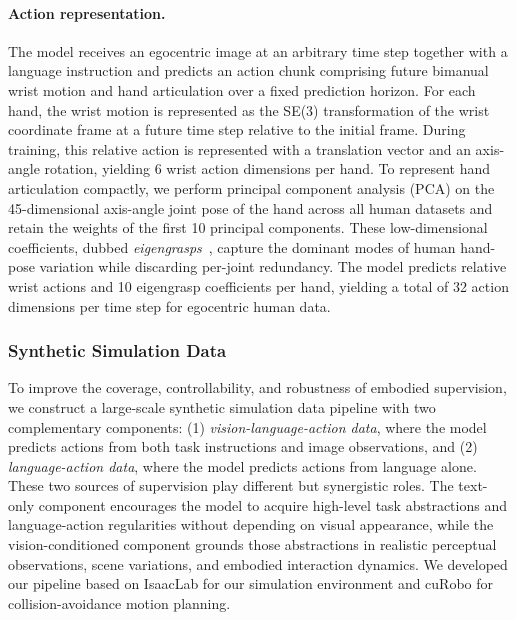 \documentclass{llmxive}
\begin{document}
\paragraph{Action representation.}
The model receives an egocentric image at an arbitrary time step together with a language instruction and predicts an action chunk comprising future bimanual wrist motion and hand articulation over a fixed prediction horizon. 
For each hand, the wrist motion is represented as the SE(3) transformation of the wrist coordinate frame at a future time step relative to the initial frame. During training, this relative action is represented with a translation vector and an axis-angle rotation, yielding 6 wrist action dimensions per hand.
To represent hand articulation compactly, we perform principal component analysis (PCA) on the 45-dimensional axis-angle joint pose of the hand across all human datasets and retain the weights of the first 10 principal components. These low-dimensional coefficients, dubbed \emph{eigengrasps}~\citep{ciocarlie2007dexterous, yuan2024crossdex}, capture the dominant modes of human hand-pose variation while discarding per-joint redundancy. The model predicts relative wrist actions and 10 eigengrasp coefficients per hand, yielding a total of 32 action dimensions per time step for egocentric human data.


\subsubsection{Synthetic Simulation Data}
\label{subsubsection:SyntheticSimulationData}
To improve the coverage, controllability, and robustness of embodied supervision, we construct a large-scale synthetic simulation data pipeline with two complementary components: (1) \emph{vision-language-action data}, where the model predicts actions from both task instructions and image observations, and (2) \emph{language-action data}, where the model predicts actions from language alone. These two sources of supervision play different but synergistic roles. The text-only component encourages the model to acquire high-level task abstractions and language-action regularities without depending on visual appearance, while the vision-conditioned component grounds those abstractions in realistic perceptual observations, scene variations, and embodied interaction dynamics. We developed our pipeline based on IsaacLab \citep{mittal2025isaaclab} for our simulation environment and cuRobo \citep{sundaralingam2023curoboparallelizedcollisionfreeminimumjerk} for collision-avoidance motion planning.
\end{document}
